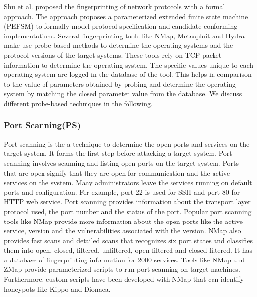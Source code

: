 Shu et al. \cite{shu2006network} proposed the fingerprinting of network protocols with a formal approach. The approach proposes a parameterized extended finite state machine (PEFSM) to formally model protocol specification and candidate conforming implementations. Several fingerprinting tools like NMap, Metasploit and Hydra make use probe-based methods to determine the operating systems and the protocol versions of the target systems. These tools rely on TCP packet information to determine the operating system. The specific values unique to each operating system are logged in the database of the tool. This helps in comparison to the value of parameters obtained by probing and determine the operating system by matching the closed parameter value from the database. We discuss different probe-based techniques in the following.

\subsubsection{Port Scanning(PS)}
Port scanning is the a technique to determine the open ports and services on the target system. It forms the first step before attacking a target system. Port scanning involves scanning and listing open ports on the target system. Ports that are open signify that they are open for communication and the active services on the system. Many administrators leave the services running on default ports and configuration. For example, port 22 is used for SSH and port 80 for HTTP web service. Port scanning provides information about the transport layer protocol used, the port number and the status of the port. Popular port scanning tools like NMap\cite{NMap} provide more information about the open ports like the active service, version and the vulnerabilities associated with the version. NMap also provides fast scans and detailed scans that recognizes six port states and classifies them into open, closed, filtered, unfiltered, open-filtered and closed-filtered. It has a database of fingerprinting information for 2000 services. 
Tools like NMap and ZMap \cite{zmap} provide parameterized scripts to run port scanning on target machines. Furthermore, custom scripts have been developed with NMap that can identify honeypots like Kippo and Dionaea.  

